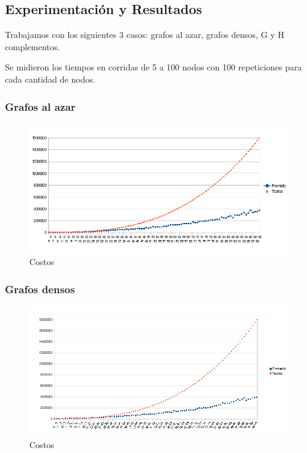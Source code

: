 \subsection{Experimentación y Resultados}
\quad Trabajamos con los siguientes 3 casos: grafos al azar, grafos densos, G y H complementos.

\quad Se midieron los tiempos en corridas de  5 a 100 nodos con 100 repeticiones para cada cantidad de nodos.

\subsubsection{Grafos al azar}

\begin{figure}[H]
	\centering
	\includegraphics[scale=0.5]{goloso tiempos Azar.png}
\caption{Costos}
\end{figure}

\subsubsection{Grafos densos}

\begin{figure}[H]
	\centering
	\includegraphics[scale=0.5]{goloso tiempos G y H densos.png}
\caption{Costos}
\end{figure}

